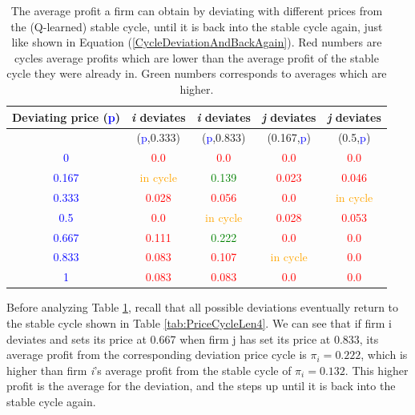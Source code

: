 \documentclass{article}
\begin{document}
\begin{table}[H]
    \centering
    \begin{tabular}{|c|c|c|c|c|}
        \hline
        Deviating price (\textcolor{blue}{p}) & \textit{i} deviates & \textit{i} deviates  & \textit{j} deviates & \textit{j} deviates \\
        \hline
         & (\textcolor{blue}{p},0.333) & (\textcolor{blue}{p},0.833)  &(0.167,\textcolor{blue}{p}) & (0.5,\textcolor{blue}{p}) \\
        \hline
        \textcolor{blue}{0} & \textcolor{red}{0.0} & \textcolor{red}{0.0}  & \textcolor{red}{0.0} & \textcolor{red}{0.0} \\
        \hline
        \textcolor{blue}{0.167}& \textcolor{orange}{in cycle} & \textcolor{green}{0.139}  & \textcolor{red}{0.023} & \textcolor{red}{0.046} \\
        \hline
        \textcolor{blue}{0.333} & \textcolor{red}{0.028} & \textcolor{red}{0.056} & \textcolor{red}{0.0} & \textcolor{orange}{in cycle} \\
        \hline
        \textcolor{blue}{0.5} & \textcolor{red}{0.0} & \textcolor{orange}{in cycle}  & \textcolor{red}{0.028} & \textcolor{red}{0.053} \\
        \hline
        \textcolor{blue}{0.667} & \textcolor{red}{0.111} & \textcolor{green}{0.222}  & \textcolor{red}{0.0} & \textcolor{red}{0.0} \\
        \hline
        \textcolor{blue}{0.833} & \textcolor{red}{0.083} & \textcolor{red}{0.107}  &\textcolor{orange}{in cycle} & \textcolor{red}{0.0} \\
        \hline
        \textcolor{blue}{1} & \textcolor{red}{0.083} & \textcolor{red}{0.083}  & \textcolor{red}{0.0} & \textcolor{red}{0.0} \\
        \hline
    \end{tabular}
    \caption{The average profit a firm can obtain by deviating with different prices from the (Q-learned) stable cycle, until it is back into the stable cycle again, just like shown in Equation (\ref{CycleDeviationAndBackAgain}). 
    Red numbers are cycles average profits which are lower than the average profit of the stable cycle they were already in. Green numbers corresponds to averages which are higher.}
    \label{tab:deviation averages}
\end{table}
Before analyzing Table \ref{tab:deviation averages}, recall that all possible deviations eventually return to the stable cycle shown in Table \ref{tab:PriceCycleLen4}.
We can see that if firm i deviates and sets its price at 0.667 when firm j has set its price at 0.833, its average profit from the corresponding deviation price cycle is $\pi_i=0.222$, which is higher than firm \textit{i}'s average profit from the stable cycle of $\pi_i=0.132$. This higher profit is the average for the deviation, and the steps up until it is back into the stable cycle again. 
\end{document}
